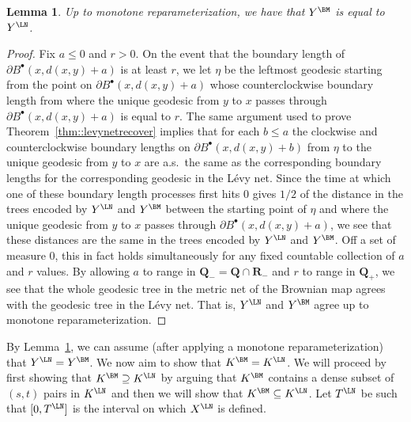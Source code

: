 \documentclass[JEP,XML,SOM,Unicode]{cedram}
\newcommand{\sbullet}{{\scriptscriptstyle\bullet}}
\theoremstyle{plain}
\numberwithin{theorem}{section}
\newtheorem{lemma}[theorem]{Lemma}
\theoremstyle{definition}
\newcommand{\R}{\mathbf{R}}
\newcommand{\Q}{{\mathbf Q}}
\newcommand{\fb}[2]{B^\sbullet(#1,#2)}
\begin{document}
\begin{lemma}
\label{lem:geodesic_tree_is_the_same}
Up to monotone reparameterization, we have that $Y^\BM$ is equal to~$Y^\LN$.
\end{lemma}
\begin{proof}
Fix $a \leq 0$ and $r > 0$. On the event that the boundary length of $\partial \fb{x}{d(x,y)+a}$ is at least $r$, we let $\eta$ be the leftmost geodesic starting from the point on $\partial \fb{x}{d(x,y)+a}$ whose counterclockwise boundary length from where the unique geodesic from $y$ to $x$ passes through $\partial \fb{x}{d(x,y)+a}$ is equal to $r$. The same argument used to prove Theorem~\ref{thm::levynetrecover} implies that for each $b \leq a$ the clockwise and counterclockwise boundary lengths on $\partial \fb{x}{d(x,y)+b}$ from $\eta$ to the unique geodesic from $y$ to $x$ are a.s.\ the same as the corresponding boundary lengths for the corresponding geodesic in the Lévy net. Since the time at which one of these boundary length processes first hits $0$ gives $1/2$ of the distance in the trees encoded by $Y^\LN$ and $Y^\BM$ between the starting point of $\eta$ and where the unique geodesic from $y$ to $x$ passes through $\partial \fb{x}{d(x,y)+a}$, we see that these distances are the same in the trees encoded by $Y^\LN$ and $Y^\BM$. Off a set of measure $0$, this in fact holds simultaneously for any fixed countable collection of $a$ and $r$ values. By allowing $a$ to range in $\Q_- = \Q \cap \R_-$ and $r$ to range in $\Q_+$, we see that the whole geodesic tree in the metric net of the Brownian map agrees with the geodesic tree in the Lévy net. That is, $Y^\LN$ and $Y^\BM$ agree up to monotone reparameterization.
\end{proof}

By Lemma~\ref{lem:geodesic_tree_is_the_same}, we can assume (after applying a monotone reparameterization) that $Y^\LN = Y^\BM$. We now aim to show that $K^\BM = K^\LN$. We will proceed by first showing that $K^\BM \supseteq K^\LN$ by arguing that $K^\BM$ contains a dense subset of $(s,t)$ pairs in $K^\LN$ and then we will show that $K^\BM \subseteq K^\LN$. Let $T^\LN$ be such that $[0,T^\LN]$ is the interval on which $X^\LN$ is defined.
\end{document}
